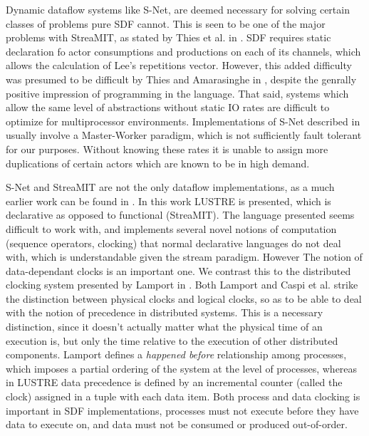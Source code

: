 Dynamic dataflow systems like S-Net, are deemed necessary for solving certain classes of problems pure SDF cannot.
This is seen to be one of the major problems with StreaMIT, as stated by Thies et al. in \cite{thies02}.
SDF requires static declaration fo actor consumptions and productions on each of its channels, which allows the calculation of Lee's repetitions vector.
However, this added difficulty was presumed to be difficult by Thies and Amarasinghe in \cite{thies10}, despite the genrally positive impression of programming in the language.
That said, systems which allow the same level of abstractions without static IO rates are difficult to optimize for multiprocessor environments.
Implementations of S-Net described in \cite{pen09} usually involve a Master-Worker paradigm, which is not sufficiently fault tolerant for our purposes.
Without knowing these rates it is unable to assign more duplications of certain actors which are known to be in high demand.

S-Net and StreaMIT are not the only dataflow implementations, as a much earlier work can be found in \cite{cas87}.
In this work LUSTRE is presented, which is declarative as opposed to functional (StreaMIT).
The language presented seems difficult to work with, and implements several novel notions of computation (sequence operators, clocking) that normal declarative languages do not deal with, which is understandable given the stream paradigm.
However The notion of data-dependant clocks is an important one.
We contrast this to the distributed clocking system presented by Lamport in \cite{lam78}.
Both Lamport and Caspi et al. strike the distinction between physical clocks and logical clocks, so as to be able to deal with the notion of precedence in distributed systems.
This is a necessary distinction, since it doesn't actually matter what the physical time of an execution is, but only the time relative to the execution of other distributed components.
Lamport defines a {\em happened before} relationship among processes, which imposes a partial ordering of the system at the level of processes, whereas in LUSTRE data precedence is defined by an incremental counter (called the clock) assigned in a tuple with each data item.
Both process and data clocking is important in SDF implementations, processes must not execute before they have data to execute on, and data must not be consumed or produced out-of-order.

